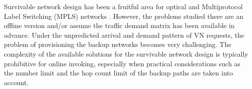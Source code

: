 



Survivable network design has been a fruitful area for
optical and Multiprotocol Label Switching (MPLS) networks
\cite{dgrover2004mesh,liu2001approximating}. However, the problems studied there are an offline
version and/or assume the traffic demand matrix has been
available in advance. Under the unpredicted arrival and demand
pattern of VN requests, the problem of provisioning the
backup networks becomes very challenging. The complexity
of the available solutions for the survivable network design
is typically prohibitive for online invoking, especially when
practical considerations such as the number limit and the hop count
limit of the backup paths are taken into account.


